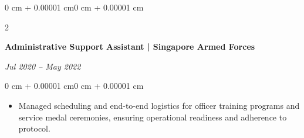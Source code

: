 \documentclass[10pt, letterpaper]{article}
\newenvironment{highlights}{
    \begin{itemize}[
        topsep=0.10 cm,
        parsep=0.10 cm,
        partopsep=0pt,
        itemsep=0pt,
        leftmargin=0 cm + 10pt
    ]
}{
    \end{itemize}
}
\newenvironment{onecolentry}{
    \begin{adjustwidth}{0 cm + 0.00001 cm}{0 cm + 0.00001 cm}
}{
    \end{adjustwidth}
}
\newenvironment{twocolentry}[2][]{
    \onecolentry
    \def\secondColumn{#2}
    \setcolumnwidth{\fill, 6 cm}
    \begin{paracol}{2}
}{
    \switchcolumn \raggedleft \secondColumn
    \end{paracol}
    \endonecolentry
}
\begin{document}
\vspace{0.1 cm}

\begin{twocolentry}{\textit{Jul 2020 – May 2022}}
    \textbf{Administrative Support Assistant | Singapore Armed Forces}
\end{twocolentry}

\vspace{0.10 cm}

\begin{onecolentry}
    \begin{highlights}
        \item Managed scheduling and end-to-end logistics for officer training programs and service medal ceremonies, ensuring operational readiness and adherence to protocol.
    \end{highlights}
\end{onecolentry}

\vspace{0.1cm}

\section{}
\vspace{0.1cm}
\end{document}
